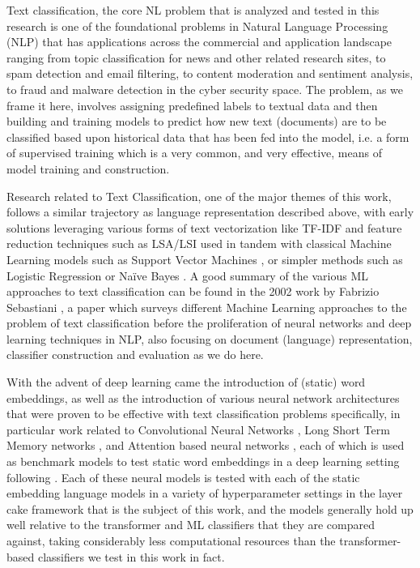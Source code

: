 \documentclass[final]{clv2025}
\begin{document}
Text classification, the core NL problem that is analyzed and tested in this research is one of the foundational problems in Natural Language Processing (NLP) that has applications across the commercial and application landscape ranging from topic classification for news and other related research sites, to spam detection and email filtering, to content moderation and sentiment analysis, to fraud and malware detection in the cyber security space. The problem, as we frame it here, involves assigning predefined labels to textual data and then building and training models to predict how new text (documents) are to be classified based upon historical data that has been fed into the model, i.e. a form of supervised training which is a very common, and very effective, means of model training and construction.

Research related to Text Classification, one of the major themes of this work, follows a similar trajectory as language representation described above, with early solutions leveraging various forms of text vectorization like TF-IDF \cite{sparckjones1972statistical} and feature reduction techniques such as LSA/LSI \cite{deerwester} used in tandem with classical Machine Learning models such as Support Vector Machines \cite{joachims1998text}, or simpler methods such as Logistic Regression or Naïve Bayes \cite{mccallum1998comparison}. A good summary of the various ML approaches to text classification can be found in the 2002 work by Fabrizio Sebastiani \cite{sebastiani2002machine}, a paper which surveys different Machine Learning approaches to the problem of text classification before the proliferation of neural networks and deep learning techniques in NLP, also focusing on document (language) representation, classifier construction and evaluation as we do here.

With the advent of deep learning came the introduction of (static) word embeddings, as well as the introduction of various neural network architectures that were proven to be effective with text classification problems specifically, in particular work related to Convolutional Neural Networks \cite{yoon2014convolutional} \cite{zhang2015character}, Long Short Term Memory networks \cite{zang2021research}, and Attention based neural networks \cite{liuguo2019bidirectional}, each of which is used as benchmark models to test static word embeddings in a deep learning setting following \cite{moreo}. Each of these neural models is tested with each of the static embedding language models in a variety of hyperparameter settings in the layer cake framework that is the subject of this work, and the models generally hold up well relative to the transformer and ML classifiers that they are compared against, taking considerably less computational resources than the transformer-based classifiers we test in this work in fact.
\end{document}
